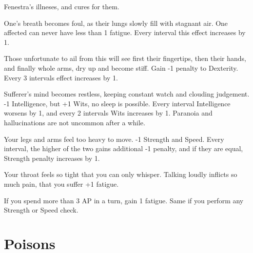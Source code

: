 \begin{multicols}{2}

Fenestra's illneses, and cures for them.


One's breath becomes foul, as their lungs slowly fill with stagnant air.
One affected can never have less than 1 \gls{fatigue}.
Every \gls{interval} this effect increases by 1.


Those unfortunate to ail from this will see first their fingertips, then their hands, and finally whole arms, dry up and become stiff.
Gain -1 penalty to Dexterity.
Every 3 \glspl{interval} effect increases by 1.


Sufferer's mind becomes restless, keeping constant watch and clouding judgement.
-1 Intelligence, but +1 Wits, no sleep is possible.
Every \gls{interval} Intelligence worsens by 1, and every 2 \glspl{interval} Wits increases by 1.
Paranoia and hallucinations are not uncommon after a while.


Your legs and arms feel too heavy to move.
-1 Strength and Speed.
Every \gls{interval}, the higher of the two gains additional -1 penalty, and if they are equal, Strength penalty increases by 1.


Your throat feels so tight that you can only whisper. Talking loudly inflicts so much pain, that you suffer +1 \gls{fatigue}.


If you spend more than 3 AP in a turn, gain 1 \gls{fatigue}.
Same if you perform any Strength or Speed check.

\end{multicols}

\section{Poisons}

